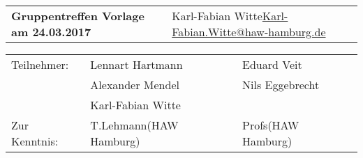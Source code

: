 \documentclass[
   draft=false
  ,paper=a4
  ,twoside=false
  ,fontsize=11pt
  ,headsepline
  ,DIV11
  ,parskip=full+
]{scrartcl} %
\begin{document}
\def\titel{Gruppentreffen Vorlage am 24.03.2017}

\def\myName{Karl-Fabian Witte}
\def\myEmail{Karl-Fabian.Witte@haw-hamburg.de}


\def\teilnehmer{ 
	& Lennart Hartmann & Eduard Veit \\
	& Alexander Mendel   & Nils Eggebrecht\\
    & Karl-Fabian Witte   & \\
}

\def\zurKenntnis {
	& T.Lehmann(HAW Hamburg) & Profs(HAW Hamburg) \\
}



\newlength{\txtw} %
\setlength{\txtw}{\textwidth} %
\addtolength{\txtw}{-10\tabcolsep} %

\def\me{\myName \newline \footnotesize{\url{\myEmail} } }

\def\tablehead{
	\hline 
	\rowcolor{tabgrey}
	\textbf{Nr.} & 
	\textbf{Art} & 
	\textbf{Stichwort und Beschreibung} & 
	\textbf{Wer} & 
	\textbf{Bis wann} \\
	\hline 
	\endhead}
\begin{tabular}{p{0.65\txtw} p{0.35\txtw}}
	\textbf{\Large{\titel}} & \me  \\
\end{tabular}

\begin{tabular}{l p{0.4\txtw} p{0.4\txtw} }
	Teilnehmer: \teilnehmer
	Zur Kenntnis: \zurKenntnis
\end{tabular}
\end{document}
